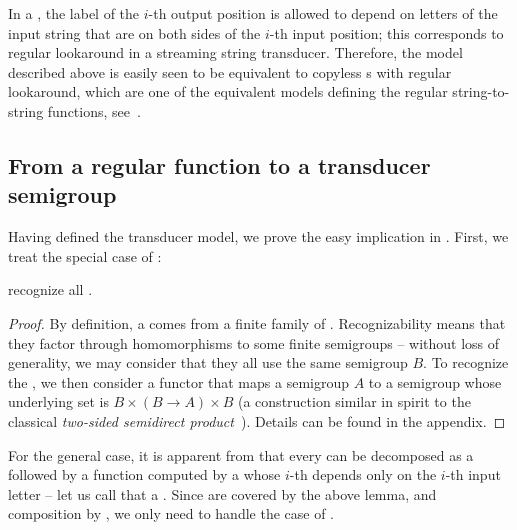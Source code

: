 In a , the label of the $i$-th output position is allowed to depend on letters of the input string that are on both sides of the $i$-th input position; this corresponds to regular lookaround in a streaming string transducer. Therefore, the model described above is easily seen to be equivalent to copyless \sst{}s with regular lookaround, which are one of the equivalent models defining the regular string-to-string functions, see~\cite[Section~IV.C]{AlurFT12}.

\subsection{From a regular function to a transducer semigroup}
\label{sec:easy}

Having defined the transducer model, we prove the easy implication in
. First, we treat the special case of :
\begin{lemma}\label{lem:rational-to-functor}
    recognize all .
\end{lemma}
\begin{proof}
  By definition, a  comes from a finite family of . Recognizability means that they factor through homomorphisms to
  some finite semigroups -- without loss of generality, we may consider that
  they all use the same semigroup $B$. To recognize the , we
  then consider a functor that maps a semigroup $A$ to a semigroup whose
  underlying set is $B \times (B \to A) \times B$ (a construction similar in
  spirit to the classical \emph{two-sided semidirect
    product}~\cite[\S6]{rhodes1989kernel}). Details can be found in the
  appendix.
\end{proof}

\AP For the general case, it is apparent from  that every
 can be decomposed as a  followed by a function
computed by a  whose $i$-th  depends
only on the $i$-th input letter -- let us call that a  \sst. Since
 are covered by the above lemma, and composition by
, we only need to handle the case of .

